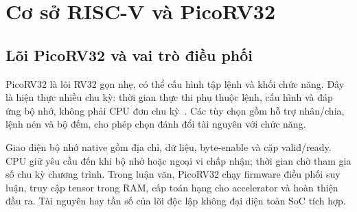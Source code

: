\section{Cơ sở RISC-V và PicoRV32}


\subsection{Lõi PicoRV32 và vai trò điều phối}
PicoRV32 là lõi RV32 gọn nhẹ, có thể cấu hình tập lệnh và khối chức năng. Đây là hiện thực nhiều chu kỳ: thời gian thực thi phụ thuộc lệnh, cấu hình và đáp ứng bộ nhớ, không phải CPU đơn chu kỳ~\cite{YosysHQ2024}. Các tùy chọn gồm hỗ trợ nhân/chia, lệnh nén và bộ đếm, cho phép chọn đánh đổi tài nguyên với chức năng.

Giao diện bộ nhớ native gồm địa chỉ, dữ liệu, byte-enable và cặp valid/ready. CPU giữ yêu cầu đến khi bộ nhớ hoặc ngoại vi chấp nhận; thời gian chờ tham gia số chu kỳ chương trình. Trong luận văn, PicoRV32 chạy firmware điều phối suy luận, truy cập tensor trong RAM, cấp toán hạng cho accelerator và hoàn thiện đầu ra. Tài nguyên hay tần số của lõi độc lập không đại diện toàn SoC tích hợp.
